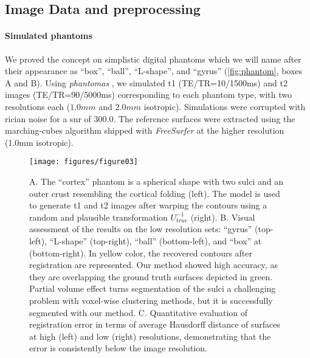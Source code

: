 \subsection{Image Data and preprocessing}
\label{sec:datasets}

\paragraph*{Simulated phantoms}%
\label{sec:digital_phantoms}
We proved the concept on simplistic digital phantoms which we will name after their
  appearance as ``box'', ``ball'', ``L-shape'', and ``gyrus'' (\autoref{fig:phantom},
  boxes A and B).
Using \emph{phantomas} \citep{caruyer_phantomas_2014}, we simulated
  \gls*{t1} (TE/TR=10/1500ms) and \gls*{t2} images (TE/TR=90/5000ms)
  corresponding to each phantom type, with two resolutions each
  ($1.0mm$ and $2.0mm$ isotropic).
Simulations were corrupted with rician noise for a \gls*{snr} of 300.0.
The reference surfaces were extracted using the marching-cubes algorithm
  shipped with \emph{FreeSurfer} \citep{fischl_freesurfer_2012}
  at the higher resolution (1.0mm isotropic).

\begin{figure*}
	\texttt{[image: figures/figure03]}
	\caption{A. The ``cortex'' phantom is a spherical shape with two sulci and an
	  outer crust resembling the cortical folding (left).
	The model is used to generate \gls*{t1} and \gls*{t2} images after warping the
	  contours using a random and plausible transformation $U_{true}^{-1}$ (right).
	B. Visual assessment of the results on the low resolution sets:
	  ``gyrus'' (top-left), ``L-shape'' (top-right), ``ball'' (bottom-left),
	  and ``box'' at (bottom-right).
	In yellow color, the recovered contours after registration are represented.
	Our method showed high accuracy, as they are overlapping the ground truth surfaces
	  depicted in green.
	Partial volume effect turns segmentation of the sulci a challenging problem with voxel-wise
	  clustering methods, but it is successfully segmented with our method.
	C. Quantitative evaluation of registration error in terms of average Hausdorff distance of
	  surfaces at high (left) and low (right) resolutions, demonstrating that the error is
	  consistently below the image resolution.
	  }\label{fig:phantom}
\end{figure*}

